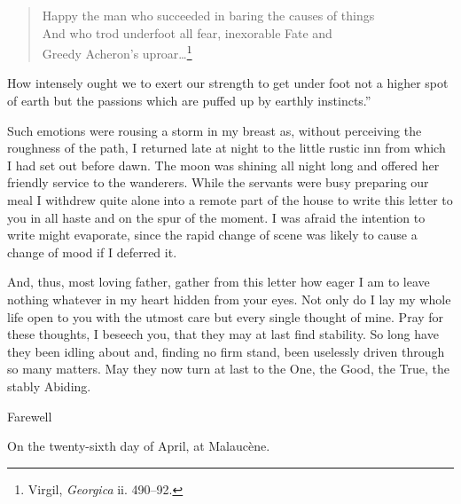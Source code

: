 \begin{quote} Happy the man who succeeded in baring the causes of
things\\ And who trod underfoot all fear, inexorable Fate and\\ Greedy
Acheron's uproar\ldots\footnote{Virgil, \textit{Georgica} ii.
490--92.} \end{quote}

\noindent How intensely ought we to exert our strength to get under
foot not a higher spot of earth but the passions which are puffed up
by earthly instincts.''

Such emotions were rousing a storm in my breast as, without perceiving
the roughness of the path, I returned late at night to the little
rustic inn from which I had set out before dawn. The moon was shining
all night long and offered her friendly service to the wanderers.
While the servants were busy preparing our meal I withdrew quite alone
into a remote part of the house to write this letter to you in all
haste and on the spur of the moment. I was afraid the intention to
write might evaporate, since the rapid change of scene was likely to
cause a change of mood if I deferred it.

And, thus, most loving father, gather from this letter how eager I am
to leave nothing whatever in my heart hidden from your eyes. Not only
do I lay my whole life open to you with the utmost care but every
single thought of mine. Pray for these thoughts, I beseech you, that
they may at last find stability. So long have they been idling about
and, finding no firm stand, been uselessly driven through so many
matters. May they now turn at last to the One, the Good, the True, the
stably Abiding.

Farewell

On the twenty-sixth day of April, at Malauc\`{e}ne.

